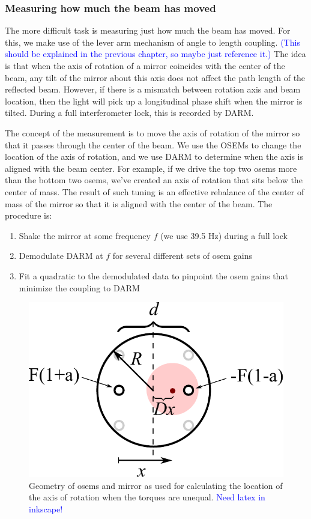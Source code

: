\subsubsection{Measuring how much the beam has moved} 
The more difficult task is measuring just how much the beam has
moved. For this, we make use of the lever arm mechanism of angle to
length coupling. \textcolor{blue}{(This should be explained in the
  previous chapter, so maybe just reference it.)} The idea is that
when the axis of rotation of a mirror coincides with the center of the
beam, any tilt of the mirror about this axis does not affect the path
length of the reflected beam. However, if there is a mismatch between
rotation axis and beam location, then the light will pick up a
longitudinal phase shift when the mirror is tilted. During a full
interferometer lock, this is recorded by DARM.

The concept of the measurement is to move the axis of rotation of the
mirror so that it passes through the center of the beam. We use the
OSEMs to change the location of the axis of rotation, and we use DARM
to determine when the axis is aligned with the beam center. For
example, if we drive the top two osems more than the bottom two osems,
we've created an axis of rotation that sits below the center of
mass. The result of such tuning is an effective rebalance of the
center of mass of the mirror so that it is aligned with the center of
the beam. The procedure is:
\begin{enumerate}
\item Shake the mirror at some frequency $f$ (we use
39.5 Hz) during a full lock \vspace{-10pt}
\item Demodulate DARM at $f$ for several different sets of osem gains \vspace{-10pt}
\item Fit a quadratic to the demodulated data to pinpoint the osem gains that
  minimize the coupling to DARM
\end{enumerate}

\begin{figure}
\begin{centering}
\includegraphics[width=0.5\columnwidth]{figures/geometry_mirror_osems.pdf}
\caption[Diagram of mirror and osem geometry]{Geometry of osems and
  mirror as used for calculating the location of the axis of rotation
  when the torques are unequal. \textcolor{blue}{Need latex in
    inkscape!}}
\label{fig:mirror_osem_geometry}
\end{centering}
\end{figure}

